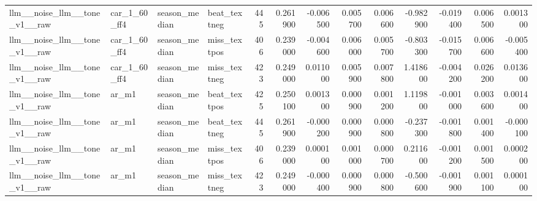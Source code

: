\begin{table}
\begin{tabular}{llllrrrrrrrrr}
llm\_\_noise\_llm\_\_tone\_v1\_\_raw & car\_1\_60\_ff4 & season\_median & beat\_textneg & 445 & 0.261900 & -0.006500 & 0.005700 & 0.006600 & -0.982900 & -0.019400 & 0.006500 & 0.001300 \\
llm\_\_noise\_llm\_\_tone\_v1\_\_raw & car\_1\_60\_ff4 & season\_median & miss\_textpos & 406 & 0.239000 & -0.004600 & 0.006000 & 0.005700 & -0.803300 & -0.015700 & 0.006600 & -0.005400 \\
llm\_\_noise\_llm\_\_tone\_v1\_\_raw & car\_1\_60\_ff4 & season\_median & miss\_textneg & 423 & 0.249000 & 0.011000 & 0.005900 & 0.007800 & 1.418600 & -0.004200 & 0.026200 & 0.013600 \\
llm\_\_noise\_llm\_\_tone\_v1\_\_raw & ar\_m1 & season\_median & beat\_textpos & 425 & 0.250100 & 0.001300 & 0.000900 & 0.001200 & 1.119800 & -0.001000 & 0.003600 & 0.001400 \\
llm\_\_noise\_llm\_\_tone\_v1\_\_raw & ar\_m1 & season\_median & beat\_textneg & 445 & 0.261900 & -0.000200 & 0.000900 & 0.000800 & -0.237300 & -0.001800 & 0.001400 & -0.000100 \\
llm\_\_noise\_llm\_\_tone\_v1\_\_raw & ar\_m1 & season\_median & miss\_textpos & 406 & 0.239000 & 0.000100 & 0.001000 & 0.000700 & 0.211600 & -0.001200 & 0.001500 & 0.000200 \\
llm\_\_noise\_llm\_\_tone\_v1\_\_raw & ar\_m1 & season\_median & miss\_textneg & 423 & 0.249000 & -0.000400 & 0.000900 & 0.000800 & -0.500600 & -0.001900 & 0.001100 & 0.000100 \\
\bottomrule
\end{tabular}
\end{table}
